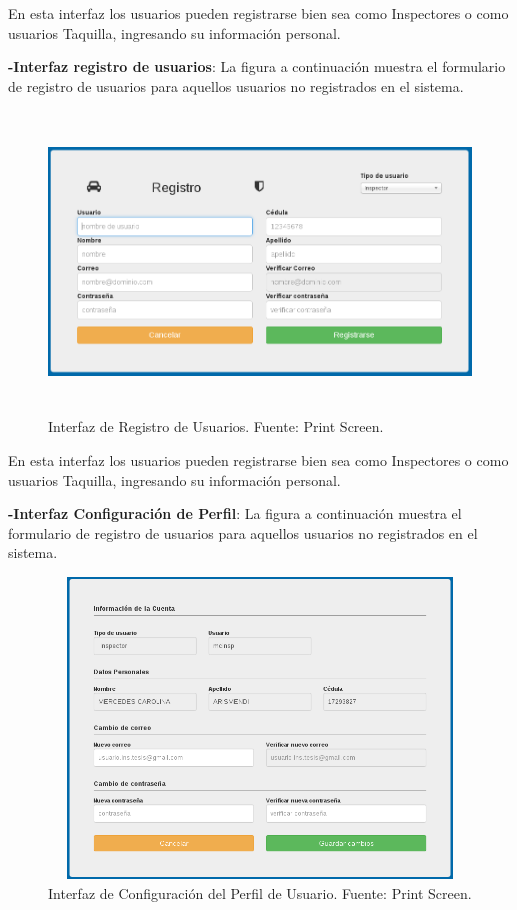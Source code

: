 En esta interfaz los usuarios pueden registrarse bien sea como Inspectores o como usuarios Taquilla, ingresando su información personal.


\textbf{-Interfaz registro de usuarios}: La figura a continuación muestra el formulario de registro de usuarios para aquellos usuarios no registrados en el sistema.

\begin{figure}[H]
\begin{center}
	\includegraphics[width=14cm,height=8cm]{img/interfaces/registro_usuario.png}
\end{center}
\caption{Interfaz de Registro de Usuarios. Fuente: Print Screen.}
\label{fig:interfaz_registro_usuario}
\end{figure}

En esta interfaz los usuarios pueden registrarse bien sea como Inspectores o como usuarios Taquilla, ingresando su información personal.


\textbf{-Interfaz Configuración de Perfil}: La figura a continuación muestra el formulario de registro de usuarios para aquellos usuarios no registrados en el sistema.

\begin{figure}[H]
\begin{center}
	\includegraphics[width=12cm,height=8cm]{img/interfaces/editar_usuario.png}
\end{center}
\caption{Interfaz de Configuración del Perfil de Usuario. Fuente: Print Screen.}
\label{fig:interfaz_configuracion_usuario}
\end{figure}

